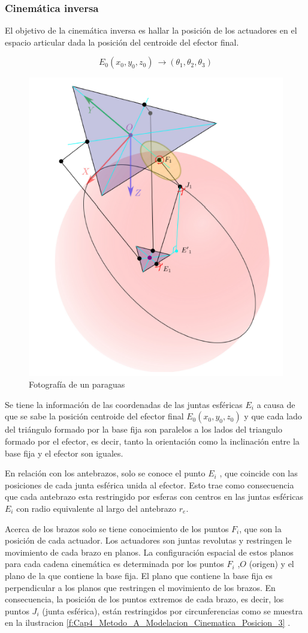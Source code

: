          \newpage


        \subsubsection{Cinemática inversa} \label{ma_ci}
        El objetivo de la cinemática inversa es hallar la posición de los actuadores en el espacio articular dada la posición del centroide del efector final.
        
        \begin{equation}
            E_0(x_0,y_0,z_0)\ \to \left({\theta }_1,{\theta }_2,{\theta }_3\right)
        \end{equation}
        
        
        \begin{figure}[htb]
             \centering
             \includegraphics[width=0.35\linewidth]{Main/Chapter4/Images4/Metodo_A_Modelacion_Cinematica_Posicion_4.png}
              \caption{Fotografía de un paraguas}
              \label{f:Cap4_Metodo_A_Modelacion_Cinematica_Posicion_4}
        \end{figure}
        
         Se tiene la informaci\'{o}n de las coordenadas de las juntas esf\'{e}ricas $E_i$ a causa de que se sabe la posici\'{o}n centroide del efector final $E_0(x_0,y_0,z_0)$ y que cada lado del tri\'{a}ngulo formado por la base fija son paralelos a los lados del triangulo formado por el efector, es decir, tanto la orientaci\'{o}n como la inclinaci\'{o}n entre la base fija y el efector son iguales.  

        En relaci\'{o}n con los antebrazos, solo se conoce el punto $E_i$ , que coincide con las posiciones de cada junta esf\'{e}rica unida al efector. Esto trae como consecuencia que cada antebrazo esta restringido por esferas con centros en las juntas esf\'{e}ricas $E_i$ con radio equivalente al largo del antebrazo $r_e$.
    
        Acerca de los brazos solo se tiene conocimiento de los puntos $F_i$, que son la posici\'{o}n de cada actuador. Los actuadores son juntas revolutas y restringen le movimiento de cada brazo en planos. La configuraci\'{o}n espacial de estos planos para cada cadena cinem\'{a}tica es determinada por los puntos $F_i$ ,$O$ (origen) y el plano de la que contiene la base fija. El plano que contiene la base fija es perpendicular a los planos que restringen el movimiento de los brazos. En consecuencia, la posici\'{o}n de los puntos extremos de cada brazo, es decir, los puntos $J_i$ (junta esf\'{e}rica), est\'{a}n restringidos por circunferencias como se muestra en la ilustracion \ref{f:Cap4_Metodo_A_Modelacion_Cinematica_Posicion_3} .

